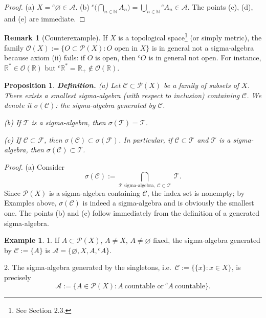 \documentclass[11pt]{article}
\newtheorem{proposition}{Proposition}[section]
\theoremstyle{definition}
\newtheorem{example}{Example}[section]
\newtheorem{remark}{Remark}[section]
\begin{document}
\begin{proof}
(a) $X={}^c\!\varnothing\in\mathcal A$. \quad
(b) ${}^{c}\!\bigl(\bigcap_{n\in\mathbb N}A_n\bigr)=\bigcup_{n\in\mathbb N} {}^{c}\!A_n\in\mathcal A$.
The points (c), (d), and (e) are immediate.
\end{proof}

\medskip\noindent
\begin{remark} [Counterexample]
If $X$ is a topological space\footnote{See Section 2.3.} (or simply metric), the family $\mathcal O(X):=\{O\subset\mathcal P(X): O \text{ open in }X\}$ is in general not a sigma-algebra because axiom (ii) fails: if $O$ is open, then ${}^{c}\!O$ is in general not open. For instance, $\mathbb R^\ast\in\mathcal O(\mathbb R)$ but ${}^{c}\!\mathbb R^\ast=\mathbb R_+\notin\mathcal O(\mathbb R)$.
\end{remark}

\begin{proposition}\label{prop:gen}
\textbf{Definition.}\quad
(a) Let $\mathscr C\subset\mathcal P(X)$ be a family of subsets of $X$. There exists a smallest sigma-algebra (with respect to inclusion) containing $\mathscr C$. We denote it $\sigma(\mathscr C)$: the sigma-algebra generated by $\mathscr C$.

(b) If $\mathcal T$ is a sigma-algebra, then $\sigma(\mathcal T)=\mathcal T$.

(c) If $\mathscr C\subset\mathscr F$, then $\sigma(\mathscr C)\subset \sigma(\mathscr F)$. In particular, if $\mathscr C\subset \mathcal T$ and $\mathcal T$ is a sigma-algebra, then $\sigma(\mathscr C)\subset\mathcal T$.
\end{proposition}

\noindent\textit{Proof.}
(a) Consider
\[
\sigma(\mathscr C):=\bigcap_{\mathcal T\ \text{sigma-algebra},\ \mathscr C\subset\mathcal T}\ \mathcal T .
\]
Since $\mathcal P(X)$ is a sigma-algebra containing $\mathscr C$, the index set is nonempty; by Examples above, $\sigma(\mathscr C)$ is indeed a sigma-algebra and is obviously the smallest one.
The points (b) and (c) follow immediately from the definition of a generated sigma-algebra.

\begin{example}
1. If $A\subset\mathcal P(X)$, $A\ne X$, $A\ne\varnothing$ fixed, the sigma-algebra generated by $\mathscr C:=\{A\}$ is $\mathcal A=\{\varnothing,X,A,{}^{c}\!A\}$.

2. The sigma-algebra generated by the singletons, i.e.\ $\mathscr C:=\{\{x\}:x\in X\}$, is precisely
\[
\mathcal A:=\{A\in\mathcal P(X): A\ \text{countable or}\ {}^{c}\!A\ \text{countable}\}.
\]

\end{example}
\end{document}
